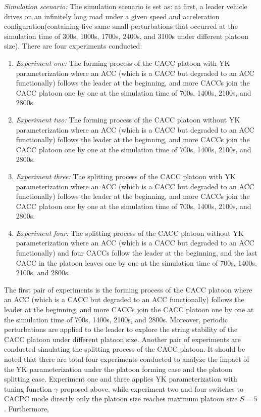 \documentclass[journal]{IEEEtran}
\begin{document}
\textit{Simulation scenario:} The simulation scenario is set as: at first, a leader vehicle drives on an infinitely long road under a given speed and acceleration configuration(containing five same small perturbations that occurred at the simulation time of 300s, 1000s, 1700s, 2400s, and 3100s under different platoon size). There are four experiments conducted:
\begin{enumerate}
  \item \textit{Experiment one:} The forming process of the CACC platoon with YK parameterization where an ACC (which is a CACC but degraded to an ACC functionally) follows the leader at the beginning, and more CACCs join the CACC platoon one by one at the simulation time of 700s, 1400s, 2100s, and 2800s.
  \item \textit{Experiment two:} The forming process of the CACC platoon without YK parameterization where an ACC (which is a CACC but degraded to an ACC functionally) follows the leader at the beginning, and more CACCs join the CACC platoon one by one at the simulation time of 700s, 1400s, 2100s, and 2800s.
  \item \textit{Experiment three:} The splitting process of the CACC platoon with YK parameterization where an ACC (which is a CACC but degraded to an ACC functionally) follows the leader at the beginning, and more CACCs join the CACC platoon one by one at the simulation time of 700s, 1400s, 2100s, and 2800s.
  \item \textit{Experiment four:} The splitting process of the CACC platoon without YK parameterization where an ACC (which is a CACC but degraded to an ACC functionally) and four CACCs follow the leader at the beginning, and the last CACC in the platoon leaves one by one at the simulation time of 700s, 1400s, 2100s, and 2800s.
\end{enumerate}
The first pair of experiments is the forming process of the CACC platoon where an ACC (which is a CACC but degraded to an ACC functionally) follows the leader at the beginning, and more CACCs join the CACC platoon one by one at the simulation time of 700s, 1400s, 2100s, and 2800s. Moreover, periodic perturbations are applied to the leader to explore the string stability of the CACC platoon under different platoon size. Another pair of experiments are conducted simulating the splitting process of the CACC platoon. It should be noted that there are total four experiments conducted to analyze the impact of the YK parameterization under the platoon forming case and the platoon splitting case. Experiment one and three applies YK parameterization with tuning function $\gamma$ proposed above, while experiment two and four switches to CACPC mode directly only the platoon size reaches maximum platoon size $S=5$. Furthermore,
\end{document}
